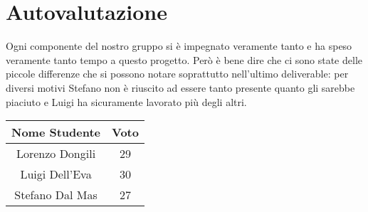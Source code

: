 \section{Autovalutazione}

Ogni componente del nostro gruppo si è impegnato veramente tanto e ha speso veramente tanto tempo a questo progetto. Però è bene dire che ci sono state delle piccole differenze che si possono notare soprattutto nell'ultimo deliverable: per diversi motivi Stefano non è riuscito ad essere tanto presente quanto gli sarebbe piaciuto e Luigi ha sicuramente lavorato più degli altri.

\begin{table}[ht]
    \centering
    \begin{tabular}{|c|c|}
    \hline
        \textbf{Nome Studente} & \textbf{Voto} \\
        \hline
        Lorenzo Dongili & 29 \\
        \hline
        Luigi Dell'Eva & 30 \\
        \hline
        Stefano Dal Mas & 27 \\
        \hline
    \end{tabular}
    \label{voti sueg}
\end{table}